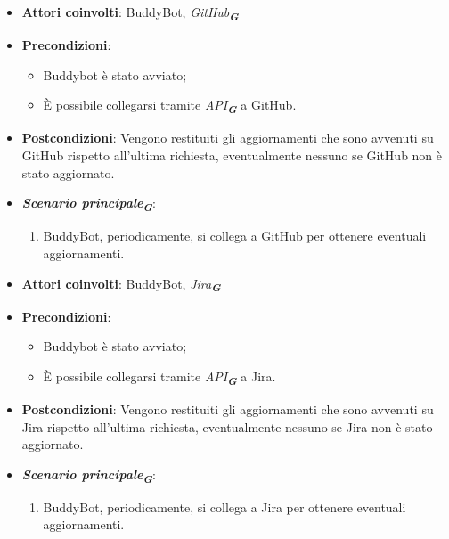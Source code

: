 
\begin{itemize}
    \item \textbf{Attori coinvolti}: BuddyBot, \emph{GitHub}\textsubscript{\textbf{\textit{G}}}
    \item \textbf{Precondizioni}: 
    \begin{itemize}
        \item Buddybot è stato avviato;
        \item È possibile collegarsi tramite \emph{API}\textsubscript{\textbf{\textit{G}}} a GitHub.
    \end{itemize}
    \item \textbf{Postcondizioni}: Vengono restituiti gli aggiornamenti che sono avvenuti su GitHub rispetto all'ultima richiesta, eventualmente nessuno 
    se GitHub non è stato aggiornato.
    \item \textbf{\emph{Scenario principale}\textsubscript{\textbf{\textit{G}}}}:
    \begin{enumerate}
        \item BuddyBot, periodicamente, si collega a GitHub per ottenere eventuali aggiornamenti.
    \end{enumerate}
\end{itemize}




\begin{itemize}
    \item \textbf{Attori coinvolti}: BuddyBot, \emph{Jira}\textsubscript{\textbf{\textit{G}}}
    \item \textbf{Precondizioni}:
    \begin{itemize}
        \item Buddybot è stato avviato;
        \item È possibile collegarsi tramite \emph{API}\textsubscript{\textbf{\textit{G}}} a Jira.
    \end{itemize}
    \item \textbf{Postcondizioni}: Vengono restituiti gli aggiornamenti che sono avvenuti su Jira rispetto all'ultima richiesta, eventualmente nessuno 
    se Jira non è stato aggiornato.
    \item \textbf{\emph{Scenario principale}\textsubscript{\textbf{\textit{G}}}}:
    \begin{enumerate}
        \item BuddyBot, periodicamente, si collega a Jira per ottenere eventuali aggiornamenti.
    \end{enumerate}
\end{itemize}



